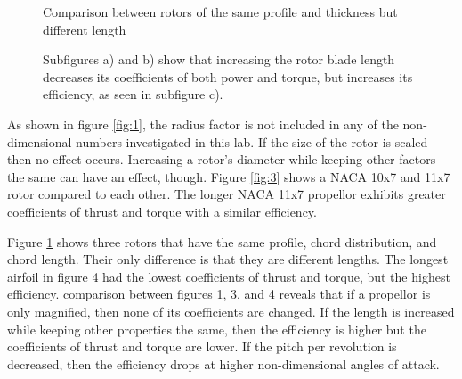 \documentclass{article}
\begin{document}
\begin{figure}
  \centering
  \caption{Comparison between rotors of the same profile and thickness but different length}
  \captionsetup{aboveskip=0pt,font=it}
  \caption*{Subfigures a) and b) show that increasing the rotor blade length decreases its coefficients of both power and torque, but increases its efficiency, as seen in subfigure c).}
  \label{fig:4}
\end{figure}

As shown in figure \ref{fig:1}, the radius factor is not included in any of the non-dimensional numbers investigated in this lab. If the size of the rotor is scaled then no effect occurs. Increasing a rotor's diameter while keeping other factors the same can have an effect, though. Figure \ref{fig:3} shows a NACA 10x7 and 11x7 rotor compared to each other. The longer NACA 11x7 propellor exhibits greater coefficients of thrust and torque with a similar efficiency. \newline

Figure \ref{fig:4} shows three rotors that have the same profile, chord distribution, and chord length. Their only difference is that they are different lengths. The longest airfoil in figure 4 had the lowest coefficients of thrust and torque, but the highest efficiency. comparison between figures 1, 3, and 4 reveals that if a propellor is only magnified, then none of its coefficients are changed. If the length is increased while keeping other properties the same, then the efficiency is higher but the coefficients of thrust and torque are lower. If the pitch per revolution is decreased, then the efficiency drops at higher non-dimensional angles of attack. 
\end{document}
